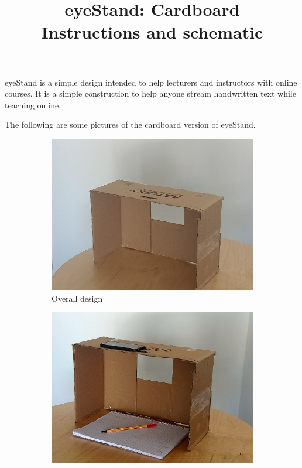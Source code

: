\documentclass[a4paper]{article}
\begin{document}
\title{eyeStand: Cardboard \\ Instructions and schematic}
\author{}

\maketitle

eyeStand is a simple design intended to help lecturers and instructors with online courses. It is a simple construction to help anyone stream handwritten text while teaching online.

The following are some pictures of the cardboard version of eyeStand. 

\begin{figure}[h!]
  \centering
  \begin{subfigure}[b]{0.4\linewidth}
    \includegraphics[width=\linewidth]{empty.jpg}
    \caption{Overall design}
  \end{subfigure}
  \begin{subfigure}[b]{0.4\linewidth}
    \includegraphics[width=\linewidth]{homeview_used.jpg}

\end{subfigure}
\end{figure}
\end{document}
